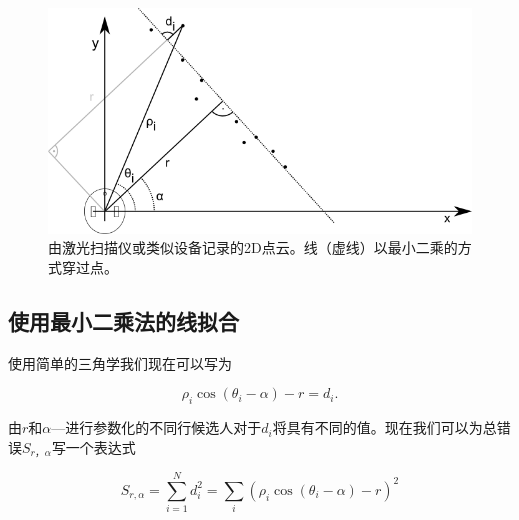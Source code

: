 \begin{figure}
	\centering
		\includegraphics[width=\textwidth]{figs/linefitting.png}
	\caption{由激光扫描仪或类似设备记录的2D点云。线（虚线）以最小二乘的方式穿过点。}
	\label{fig:linefitting}
\end{figure}

\subsection{使用最小二乘法的线拟合}

使用简单的三角学我们现在可以写为

\begin{equation}
\rho_i \cos(\theta_i-\alpha)-r=d_i.
\end{equation}


由$r$和$\alpha$---进行参数化的不同行候选人对于$d_i$将具有不同的值。现在我们可以为总错误$S_{r，\alpha}$写一个表达式


\begin{equation}
S_{r,\alpha}=\sum_{i=1}^{N}{d_i^2}=\sum_i(\rho_i \cos(\theta_i-\alpha)-r)^2
\end{equation}


